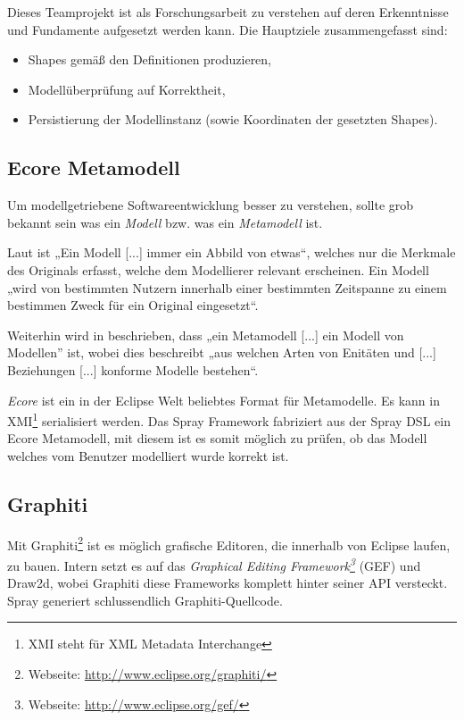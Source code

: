 Dieses Teamprojekt ist als Forschungsarbeit zu verstehen
auf deren Erkenntnisse und Fundamente aufgesetzt werden kann.
Die Hauptziele zusammengefasst sind:

\begin{itemize}
  \item Shapes gemäß den Definitionen produzieren,
  \item Modellüberprüfung auf Korrektheit,
  \item Persistierung der Modellinstanz (sowie Koordinaten der gesetzten Shapes).
\end{itemize}


\subsection{Ecore Metamodell}\label{sec.ecore}

Um modellgetriebene Softwareentwicklung besser zu verstehen,
sollte grob bekannt sein was ein \emph{Modell} bzw. was ein
\emph{Metamodell} ist.

Laut \citep[][S.~2-1]{drachen} ist „Ein Modell [...] immer ein Abbild von etwas“,
welches nur die Merkmale des Originals erfasst, welche dem Modellierer
relevant erscheinen.
Ein Modell „wird von bestimmten Nutzern innerhalb einer bestimmten Zeitspanne
zu einem bestimmen Zweck für ein Original eingesetzt“.

Weiterhin wird in \citep[][S.~2-5]{drachen} beschrieben, dass
„ein Metamodell [...] ein Modell von Modellen” ist, wobei dies beschreibt
„aus welchen Arten von Enitäten und [...] Beziehungen [...] konforme Modelle
bestehen“.

\emph{Ecore} ist ein in der Eclipse Welt beliebtes Format für Metamodelle.
Es kann in XMI\footnote{XMI steht für XML Metadata Interchange} serialisiert
werden. Das Spray Framework fabriziert aus der Spray DSL ein Ecore Metamodell,
mit diesem ist es somit möglich zu prüfen, ob das Modell welches vom
Benutzer modelliert wurde korrekt ist.


\subsection{Graphiti}

Mit Graphiti\footnote{Webseite: \url{http://www.eclipse.org/graphiti/}}
ist es möglich grafische Editoren, die innerhalb von Eclipse laufen, zu bauen.
Intern setzt es auf das \emph{Graphical Editing
Framework\footnote{Webseite: \url{http://www.eclipse.org/gef/}}} (GEF)
und Draw2d, wobei Graphiti diese Frameworks komplett hinter seiner API
versteckt. Spray generiert schlussendlich Graphiti-Quellcode.
\citep[sinngemäß aus][S.~2]{sprayPaper}

